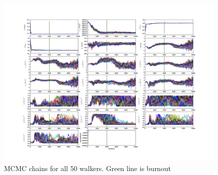 \documentclass{article}
\begin{document}
\begin{figure}[!htb]
\centering
\includegraphics[width=\textwidth]{chainPlot_10000.jpg}
\caption{MCMC chains for all 50 walkers. Green line is burnout}
\end{figure}
\end{document}
